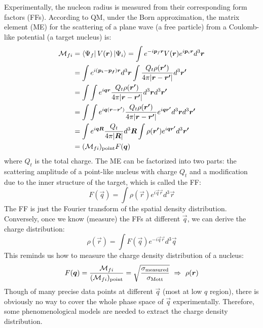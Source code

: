 Experimentally, the nucleon radius is measured from their corresponding form
factors (FFs). According to QM, under the Born approximation, the matrix element (ME) 
for the scattering of a plane wave (a free particle) from a Coulomb-like potential 
(a target nucleus) is:
\begin{equation}
    \begin{aligned}
	\CM_{fi} &= \bra{\Psi_f}V(\vec{r})\ket{\Psi_i} 
		= \int e^{-i\vec{p}_f\vec{r}}V(\vec{r}) e^{i\vec{p}_i\vec{r}} d^3\vec{r}    \\	%
	    &= \int e^{i(\vec{p_i} - \vec{p_f})\vec{r}} d^3\vec{r} 
		\int \frac{Q_t\rho(\vec{r'})}{4\pi|\vec{r} - \vec{r'}|} d^3\vec{r'} \\	%
	    &= \int \int e^{i\vec{q} \vec{r} } 
		 \frac{Q_t \rho(\vec{r'})}{4\pi|\vec{r} - \vec{r'}|} d^3\vec{r} d^3\vec{r'} \\	%
	    &= \int\int e^{i\vec{q}(\vec{r} - \vec{r'})} 
		\frac{Q_t\rho(\vec{r'})}{4\pi|\vec{r} - \vec{r'}|} e^{i\vec{q}\vec{r'}} d^3\vec{r} d^3\vec{r'}   \\  %
	    &= \int e^{i\vec{q}\vec{R}} \frac{Q_t}{4\pi|\vec{R}|} d^3\vec{R} 
		\int \rho(\vec{r'}) e^{i\vec{q} \vec{r'}}d^3 \vec{r'}	\\  %
	    &= (\CM_{fi})_{\text{point}} F(\vec{q})   \\	%
    \end{aligned}
    \label{eq:ME}
\end{equation}
where $Q_t$ is the total charge. The ME can be factorized into two parts: the 
scattering amplitude of a point-like nucleus with charge $Q_t$ and a modification
due to the inner structure of the target, which is called the FF:
\begin{equation}
    F(\vec{q}) = \int \rho(\vec{r}) e^{i\vec{q} \vec{r}} d^3\vec{r}
    \label{eq:ff}
\end{equation}
The FF is just the Fourier transform of the spatial density distribution.
Conversely, once we know (measure) the FFs at different $\vec{q}$, we can
derive the charge distribution:
\begin{equation}
    \rho(\vec{r}) = \int F(\vec{q}) e^{-i\vec{q}\vec{r}} d^3\vec{q}
\end{equation}
This reminds us how to measure the charge density distribution of a nucleus:
\begin{equation}
    F(\boldsymbol{q}) = \frac{\mathcal{M}_{fi}}{(\mathcal{M}_{fi})_{\text{point}}} 
	= \sqrt{\frac{\sigma_{\text{measured}}}{\sigma_{\text{Mott}}}} \ \Rightarrow\  \rho(\boldsymbol{r})
\end{equation}
Though of many precise data points at different $\vec{q}$ (most at low $q$ region), 
there is obviously no way
to cover the whole phase space of $\vec{q}$ experimentally. Therefore, some phenomenological
models are needed to extract the charge density distribution. 

